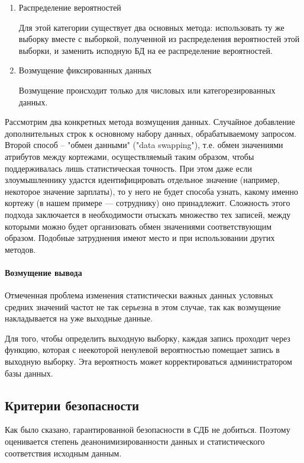 \begin{enumerate}
  \item Распределение вероятностей
  
Для этой категории существует два основных метода: использовать ту же выборку вместе с выборкой, полученной из распределения вероятностей этой выборки, и заменить исподную БД на ее распределение вероятностей.

  \item Возмущение фиксированных данных
  
Возмущение происходит только для числовых или категорезированных данных.
   
\end{enumerate}


Рассмотрим два конкретных метода возмущения данных. 
Случайное добавление дополнительных строк к основному набору данных, обрабатываемому запросом.
Второй способ -- "обмен данными" ("data swapping"), т.е. обмен значениями атрибутов между кортежами, осуществляемый таким образом, чтобы поддерживалась лишь статистическая точность. При этом даже если злоумышленнику удастся идентифицировать отдельное значение (например, некоторое значение зарплаты), то у него не будет способа узнать, какому именно кортежу (в нашем примере — сотруднику) оно принадлежит. Сложность этого подхода заключается в необходимости отыскать множество тех записей, между которыми можно будет организовать обмен значениями соответствующим образом. Подобные затруднения имеют место и при использовании других методов.

\paragraph{Возмущение вывода}

Отмеченная проблема изменения статистически важных данных условных средних значений частот не так серьезна в этом случае, так как возмущение накладывается на уже выходные данные.

Для того, чтобы определить выходную выборку, каждая запись проходит через функцию, которая с неекоторой ненулевой вероятностью помещает запись в выходную выборку. Эта вероятность может корректироваться администратором базы данных. 

  \subsection{Критерии безопасности}

Как было сказано, гарантированной безопасности в СДБ не добиться. Поэтому оценивается степень деанонимизированности данных и статистического соответствия исходным данным.

